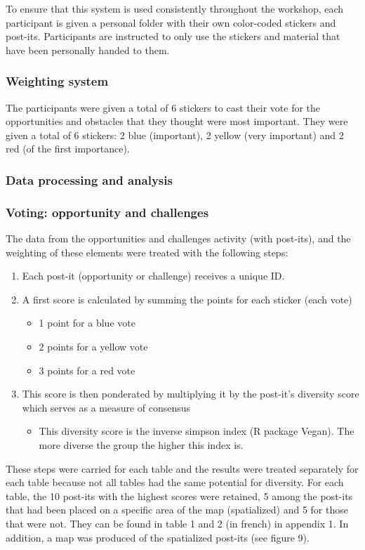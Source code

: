 To ensure that this system is used consistently throughout the workshop, each participant is given a personal folder with their own color-coded stickers and post-its. Participants are instructed to only use the stickers and material that have been personally handed to them.\\

\subsubsection{Weighting system}

 The participants were given a total of 6 stickers to cast their vote for the opportunities and obstacles that they thought were most important. They were given a total of 6 stickers: 2 blue (important), 2 yellow (very important) and 2 red (of the first importance).\\

\subsubsection{Data processing and analysis}

\subsubsection*{Voting: opportunity and challenges}

The data from the opportunities and challenges activity (with post-its), and the weighting of these elements were treated with the following steps:
\begin{enumerate}
  \item Each post-it (opportunity or challenge) receives a unique ID.
  \item A first score is calculated by summing the points for each sticker (each vote)
  \begin{itemize}
      \item 1 point for a blue vote
      \item 2 points for a yellow vote
      \item 3 points for a red vote
  \end{itemize}
  \item This score is then ponderated by multiplying it by the post-it’s diversity score which serves as a measure of consensus
\begin{itemize}
\item This diversity score is the inverse simpson index (R package Vegan). The more diverse the group the higher this index is.
\end{itemize}
\end{enumerate}
These steps were carried for each table and the results were treated separately for each table because not all tables had the same potential for diversity. For each table, the 10 post-its with the highest scores were retained, 5 among the post-its that had been placed on a specific area of the map (spatialized) and 5 for those that were not. They can be found in table 1 and 2 (in french) in appendix 1. In addition, a map was produced of the spatialized post-its (see figure 9).

